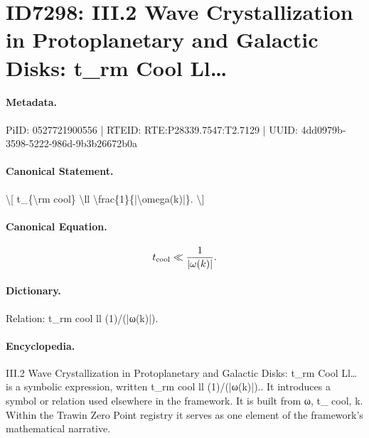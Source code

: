 \section*{ID7298: III.2 Wave Crystallization in Protoplanetary and Galactic Disks: t\_rm Cool Ll…}
\paragraph{Metadata.}
PiID: 0527721900556 | RTEID: RTE:P28339.7547:T2.7129 | UUID: 4dd0979b-3598-5222-986d-9b3b26672b0a

\paragraph{Canonical Statement.}
\textbackslash{}[ t\_\{\textbackslash{}rm cool\} \textbackslash{}ll \textbackslash{}frac\{1\}\{|\textbackslash{}omega(k)|\}. \textbackslash{}]

\paragraph{Canonical Equation.}
\[
t_{\rm cool} \ll \frac{1}{|\omega(k)|}.
\]

\paragraph{Dictionary.}
Relation: t\_rm cool ll (1)/(|ω(k)|).

\paragraph{Encyclopedia.}
III.2 Wave Crystallization in Protoplanetary and Galactic Disks: t\_rm Cool Ll… is a symbolic expression, written t\_rm cool ll (1)/(|ω(k)|).. It introduces a symbol or relation used elsewhere in the framework. It is built from ω, t\_ cool, k. Within the Trawin Zero Point registry it serves as one element of the framework's mathematical narrative.
